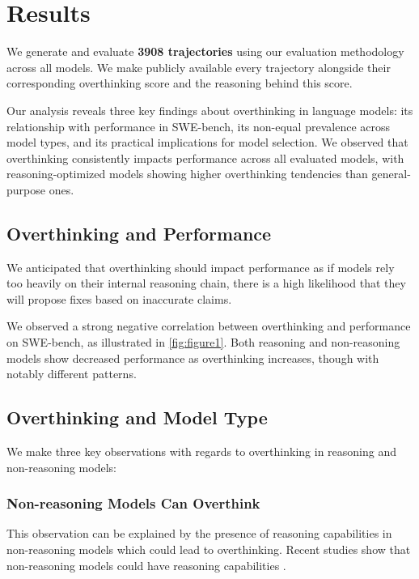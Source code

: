 \chapter{Results}
\label{results}

We generate and evaluate \textbf{3908 trajectories} using our evaluation methodology across all models. We make publicly available every trajectory alongside their corresponding overthinking score and the reasoning behind this score.

Our analysis reveals three key findings about overthinking in language models: its relationship with performance in SWE-bench, its non-equal prevalence across model types, and its practical implications for model selection. We observed that overthinking consistently impacts performance across all evaluated models, with reasoning-optimized models showing higher overthinking tendencies than general-purpose ones.

\section{Overthinking and Performance}
\label{sec:perf}

We anticipated that overthinking should impact performance as if models rely too heavily on their internal reasoning chain, there is a high likelihood that they will propose fixes based on inaccurate claims.

We observed a strong negative correlation between overthinking and performance on SWE-bench, as illustrated in \cref{fig:figure1}. Both reasoning and non-reasoning models show decreased performance as overthinking increases, though with notably different patterns.

\section{Overthinking and Model Type}
\label{sec:model_type}

We make three key observations with regards to overthinking in reasoning and non-reasoning models:

\subsection{Non-reasoning Models Can Overthink}
This observation can be explained by the presence of reasoning capabilities in non-reasoning models which could lead to overthinking. Recent studies show that non-reasoning models could have reasoning capabilities \cite{wei2023chainofthoughtpromptingelicitsreasoning, yao2023treethoughtsdeliberateproblem, chen2023program, kojima2023largelanguagemodelszeroshot}.

